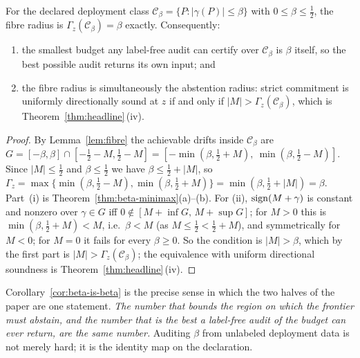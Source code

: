 \begin{corollary}\label{cor:beta-is-beta}
For the declared deployment class $\mathcal C_\beta=\{P:|\gamma(P)|\le\beta\}$ with
$0\le\beta\le\tfrac12$, the fibre radius is $\Gamma_z(\mathcal C_\beta)=\beta$ exactly.
Consequently:
\begin{enumerate}
\item[\textnormal{(i)}] the smallest budget any label-free audit can certify over
$\mathcal C_\beta$ is $\beta$ itself, so the best possible audit returns its own input; and
\item[\textnormal{(ii)}] the fibre radius is simultaneously the abstention radius: strict
commitment is uniformly directionally sound at $z$ if and only if
$|M|>\Gamma_z(\mathcal C_\beta)$, which is Theorem~\ref{thm:headline}\,(iv).
\end{enumerate}
\end{corollary}
\begin{proof}
By Lemma~\ref{lem:fibre} the achievable drifts inside $\mathcal C_\beta$ are
$G=[-\beta,\beta]\cap[-\tfrac12-M,\tfrac12-M]
=[-\min(\beta,\tfrac12+M),\ \min(\beta,\tfrac12-M)]$. Since $|M|\le\tfrac12$ and
$\beta\le\tfrac12$ we have $\beta\le\tfrac12+|M|$, so
$\Gamma_z=\max\{\min(\beta,\tfrac12-M),\min(\beta,\tfrac12+M)\}=\min(\beta,\tfrac12+|M|)=\beta$.
Part~(i) is Theorem~\ref{thm:beta-minimax}(a)--(b). For (ii), $\operatorname{sign}(M+\gamma)$ is constant
and nonzero over $\gamma\in G$ iff $0\notin[M+\inf G,\,M+\sup G]$; for $M>0$ this is
$\min(\beta,\tfrac12+M)<M$, i.e.\ $\beta<M$ (as $M\le\tfrac12<\tfrac12+M$), and symmetrically
for $M<0$; for $M=0$ it fails for every $\beta\ge0$. So the condition is $|M|>\beta$, which by
the first part is $|M|>\Gamma_z(\mathcal C_\beta)$; the equivalence with uniform directional
soundness is Theorem~\ref{thm:headline}\,(iv).
\end{proof}

\noindent Corollary~\ref{cor:beta-is-beta} is the precise sense in which the two halves of
the paper are one statement. \emph{The number that bounds the region on which the frontier
must abstain, and the number that is the best a label-free audit of the budget can ever
return, are the same number.} Auditing $\beta$ from unlabeled deployment data is not merely
hard; it is the identity map on the declaration.

